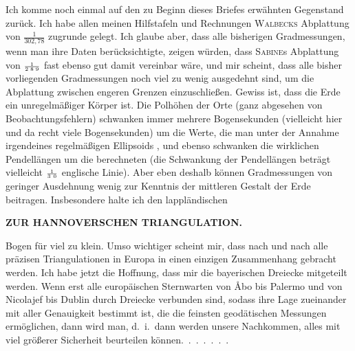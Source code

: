 \par\noindent\hspace*{\parindent}Ich komme noch einmal auf den zu Beginn dieses Briefes erwähnten Gegenstand zurück.
Ich habe allen meinen Hilfstafeln und Rechnungen \textsc{Walbecks} Abplattung von \(\frac{1}{302{,}78}\) zugrunde gelegt. Ich glaube aber, dass alle bisherigen Gradmessungen, wenn man ihre Daten  berücksichtigte, zeigen würden, dass \textsc{Sabine}s Abplattung von \(\scriptstyle\frac{1}{2\mkern5mu 8\mkern5mu 9}\) fast ebenso gut damit vereinbar wäre, und mir scheint, dass alle bisher vorliegenden Gradmessungen noch viel zu wenig ausgedehnt sind, um die Abplattung zwischen engeren Grenzen einzuschließen.
Gewiss ist, dass die Erde ein unregelmäßiger Körper ist. Die Polhöhen der Orte (ganz abgesehen von Beobachtungsfehlern) schwanken immer mehrere Bogensekunden (vielleicht hier und da recht viele Bogensekunden) um die Werte, die man unter der Annahme irgendeines regelmäßigen Ellipsoids , und ebenso schwanken die wirklichen Pendellängen um die berechneten (die  Schwankung der Pendellängen beträgt vielleicht \(\scriptstyle\frac{1}{3\mkern7mu 0}\) englische Linie).
Aber eben deshalb können Gradmessungen von geringer Ausdehnung wenig zur Kenntnis der mittleren Gestalt der Erde beitragen. Insbesondere halte ich den lappländischen
\par\clearpage
\noindent\null\hfill{\small\textbf{ZUR HANNOVERSCHEN TRIANGULATION.}}\hfill{}\par\medskip
\noindent Bogen für viel zu klein.
Umso wichtiger scheint mir, dass nach und nach alle präzisen Triangulationen in Europa in einen einzigen Zusammenhang gebracht werden.
Ich habe jetzt die Hoffnung, dass mir die bayerischen Dreiecke mitgeteilt werden.
Wenn erst alle europäischen Sternwarten von Åbo bis Palermo und von Nicolajef bis Dublin durch Dreiecke verbunden sind, sodass ihre Lage zueinander mit aller Genauigkeit bestimmt ist, die die feinsten geodätischen Messungen ermöglichen, dann wird man, d.~i.\ dann werden unsere Nachkommen, alles mit viel größerer Sicherheit beurteilen \mbox{können.\ .\ .\ .\ .\ .\ .}
